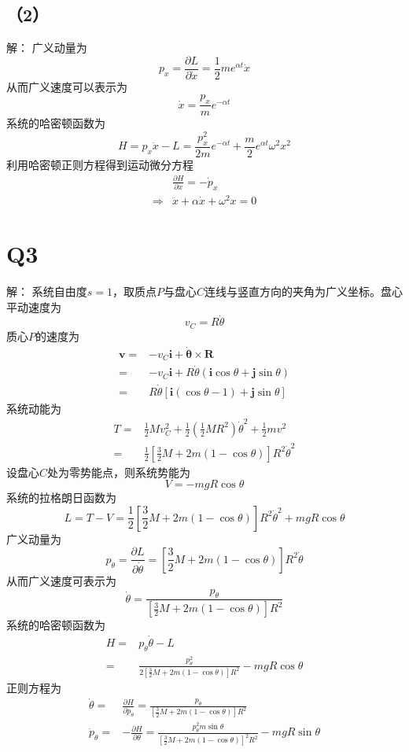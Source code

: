 \documentclass[10pt,a4paper]{article}
\begin{document}
\subsection*{（2）}解：
广义动量为
\[
p_x=\frac{\partial L}{\partial\dot{x}}=\frac{1}{2}me^{\alpha t}\dot{x}
\]
从而广义速度可以表示为
\[
\dot{x}=\frac{p_x}{m}e^{-\alpha t}
\]
系统的哈密顿函数为
\[
H=p_x\dot{x}-L=\frac{p_x^2}{2m}e^{-\alpha t}+\frac{m}{2}e^{\alpha t}\omega^2x^2
\]
利用哈密顿正则方程得到运动微分方程
\begin{align*}
&\frac{\partial H}{\partial x}=-\dot{p}_x\\
\Longrightarrow&\ddot{x}+\alpha\dot{x}+\omega^2x=0
\end{align*}
\section*{Q3}解：
系统自由度$s=1$，取质点$P$与盘心$C$连线与竖直方向的夹角为广义坐标。盘心平动速度为
\[
v_C=R\dot{\theta}
\]
质心$P$的速度为
\begin{align*}
\bm{v}=&-v_C\bm{i}+\bm{\dot{\theta}}\times\bm{R}\\
=&-v_C\bm{i}+R\dot{\theta}(\bm{i}\cos\theta+\bm{j}\sin\theta)\\
=&R\dot{\theta}[\bm{i}(\cos\theta-1)+\bm{j}\sin\theta]
\end{align*}
系统动能为
\begin{align*}
T=&\frac{1}{2}Mv_C^2+\frac{1}{2}(\frac{1}{2}MR^2)\dot{\theta}^2+\frac{1}{2}mv^2\\
=&\frac{1}{2}[\frac{3}{2}M+2m(1-\cos\theta)]R^2\dot{\theta}^2
\end{align*}
设盘心$C$处为零势能点，则系统势能为
\[
V=-mgR\cos\theta
\]
系统的拉格朗日函数为
\[
L=T-V=\frac{1}{2}[\frac{3}{2}M+2m(1-\cos\theta)]R^2\dot{\theta}^2+mgR\cos\theta
\]
广义动量为
\[
p_{\theta}=\frac{\partial L}{\partial\dot{\theta}}=[\frac{3}{2}M+2m(1-\cos\theta)]R^2\dot{\theta}
\]
从而广义速度可表示为
\[
\dot{\theta}=\frac{p_{\theta}}{[\frac{3}{2}M+2m(1-\cos\theta)]R^2}
\]
系统的哈密顿函数为
\begin{align*}
H=&p_{\theta}\dot{\theta}-L\\
=&\frac{p_{\theta}^2}{2[\frac{3}{2}M+2m(1-\cos\theta)]R^2}-mgR\cos\theta
\end{align*}
正则方程为
\begin{align*}
\dot{\theta}=&\frac{\partial H}{\partial p_{\theta}}=\frac{p_{\theta}}{[\frac{3}{2}M+2m(1-\cos\theta)]R^2}\\
\dot{p}_{\theta}=&-\frac{\partial H}{\partial\theta}=\frac{p_{\theta}^2m\sin\theta}{[\frac{3}{2}M+2m(1-\cos\theta)]^2R^2}-mgR\sin\theta
\end{align*}
\end{document}
